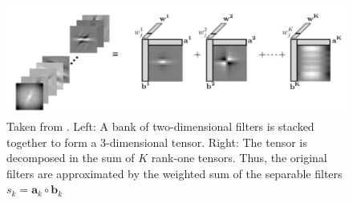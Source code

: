 \begin{figure}
    \centering
    \includegraphics[width=.8\linewidth]{Pics/02_Previous_work/separable_filters.png}
    \caption{Taken from \cite{Sironi2015}. Left: A bank of two-dimensional filters is stacked together to form a 3-dimensional tensor. Right: The tensor is decomposed in the sum of $K$ rank-one tensors. Thus, the original filters are approximated by the weighted sum of the separable filters $s_k = \boldsymbol{a}_k \circ \boldsymbol{b}_k$}
    \label{fig:separable_filters}
\end{figure}

